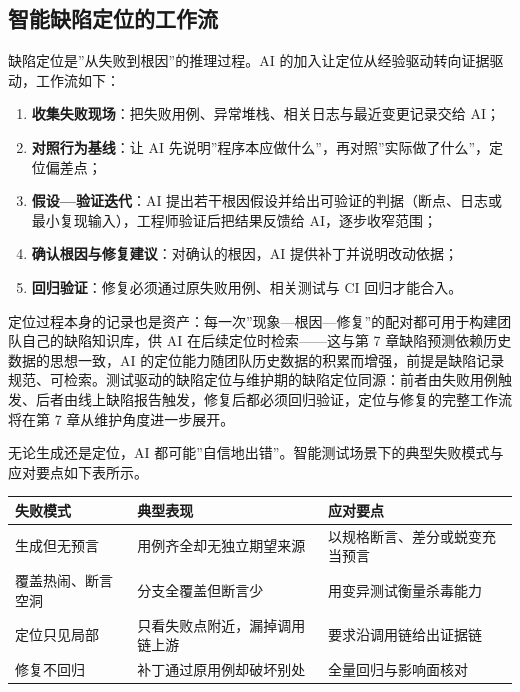 \documentclass[12pt,a4paper,twoside,openany]{ctexbook}
\numberwithin{figure}{chapter}
\numberwithin{table}{chapter}
\providecommand{\tightlist}{\setlength{\itemsep}{0pt}\setlength{\parskip}{0pt}}
\newcounter{none}
\begin{document}
\subsection{智能缺陷定位的工作流}\label{ux667aux80fdux7f3aux9677ux5b9aux4f4dux7684ux5de5ux4f5cux6d41}

缺陷定位是''从失败到根因''的推理过程。AI
的加入让定位从经验驱动转向证据驱动，工作流如下：

\begin{enumerate}
\def\labelenumi{\arabic{enumi}.}
\tightlist
\item
  \textbf{收集失败现场}：把失败用例、异常堆栈、相关日志与最近变更记录交给
  AI；
\item
  \textbf{对照行为基线}：让 AI
  先说明''程序本应做什么''，再对照''实际做了什么''，定位偏差点；
\item
  \textbf{假设---验证迭代}：AI
  提出若干根因假设并给出可验证的判据（断点、日志或最小复现输入），工程师验证后把结果反馈给
  AI，逐步收窄范围；
\item
  \textbf{确认根因与修复建议}：对确认的根因，AI 提供补丁并说明改动依据；
\item
  \textbf{回归验证}：修复必须通过原失败用例、相关测试与 CI
  回归才能合入。
\end{enumerate}

定位过程本身的记录也是资产：每一次''现象---根因---修复''的配对都可用于构建团队自己的缺陷知识库，供
AI 在后续定位时检索------这与第 7 章缺陷预测依赖历史数据的思想一致，AI
的定位能力随团队历史数据的积累而增强，前提是缺陷记录规范、可检索。测试驱动的缺陷定位与维护期的缺陷定位同源：前者由失败用例触发、后者由线上缺陷报告触发，修复后都必须回归验证，定位与修复的完整工作流将在第
7 章从维护角度进一步展开。

无论生成还是定位，AI
都可能''自信地出错''。智能测试场景下的典型失败模式与应对要点如下表所示。

{\def\LTcaptype{none} %
\begin{longtable}[]{@{}
  >{\raggedright\arraybackslash}p{}
  >{\raggedright\arraybackslash}p{}
  >{\raggedright\arraybackslash}p{}@{}}
\toprule\noalign{}
\begin{minipage}[b]{\linewidth}\raggedright
失败模式
\end{minipage} & \begin{minipage}[b]{\linewidth}\raggedright
典型表现
\end{minipage} & \begin{minipage}[b]{\linewidth}\raggedright
应对要点
\end{minipage} \\
\midrule\noalign{}
\endhead
\bottomrule\noalign{}
\endlastfoot
生成但无预言 & 用例齐全却无独立期望来源 &
以规格断言、差分或蜕变充当预言 \\
覆盖热闹、断言空洞 & 分支全覆盖但断言少 & 用变异测试衡量杀毒能力 \\
定位只见局部 & 只看失败点附近，漏掉调用链上游 &
要求沿调用链给出证据链 \\
修复不回归 & 补丁通过原用例却破坏别处 & 全量回归与影响面核对 \\
\end{longtable}
}
\end{document}
